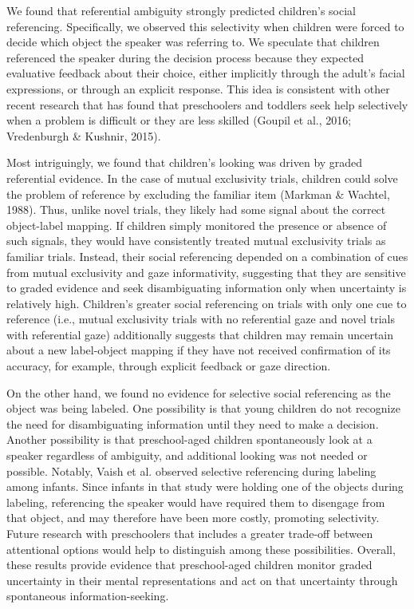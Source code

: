 \documentclass[a4paper,man,apacite,floatsintext]{apa6}
\begin{document}
We found that referential ambiguity strongly predicted children's social
referencing. Specifically, we observed this selectivity when children
were forced to decide which object the speaker was referring to. We
speculate that children referenced the speaker during the decision
process because they expected evaluative feedback about their choice,
either implicitly through the adult's facial expressions, or through an
explicit response. This idea is consistent with other recent research
that has found that preschoolers and toddlers seek help selectively when
a problem is difficult or they are less skilled (Goupil et al., 2016;
Vredenburgh \& Kushnir, 2015).

Most intriguingly, we found that children's looking was driven by graded
referential evidence. In the case of mutual exclusivity trials, children
could solve the problem of reference by excluding the familiar item
(Markman \& Wachtel, 1988). Thus, unlike novel trials, they likely had
some signal about the correct object-label mapping. If children simply
monitored the presence or absence of such signals, they would have
consistently treated mutual exclusivity trials as familiar trials.
Instead, their social referencing depended on a combination of cues from
mutual exclusivity and gaze informativity, suggesting that they are
sensitive to graded evidence and seek disambiguating information only
when uncertainty is relatively high. Children's greater social
referencing on trials with only one cue to reference (i.e., mutual
exclusivity trials with no referential gaze and novel trials with
referential gaze) additionally suggests that children may remain
uncertain about a new label-object mapping if they have not received
confirmation of its accuracy, for example, through explicit feedback or
gaze direction.

On the other hand, we found no evidence for selective social referencing
as the object was being labeled. One possibility is that young children
do not recognize the need for disambiguating information until they need
to make a decision. Another possibility is that preschool-aged children
spontaneously look at a speaker regardless of ambiguity, and additional
looking was not needed or possible. Notably, Vaish et al. observed
selective referencing during labeling among infants. Since infants in
that study were holding one of the objects during labeling, referencing
the speaker would have required them to disengage from that object, and
may therefore have been more costly, promoting selectivity. Future
research with preschoolers that includes a greater trade-off between
attentional options would help to distinguish among these possibilities.
Overall, these results provide evidence that preschool-aged children
monitor graded uncertainty in their mental representations and act on
that uncertainty through spontaneous information-seeking.
\end{document}
